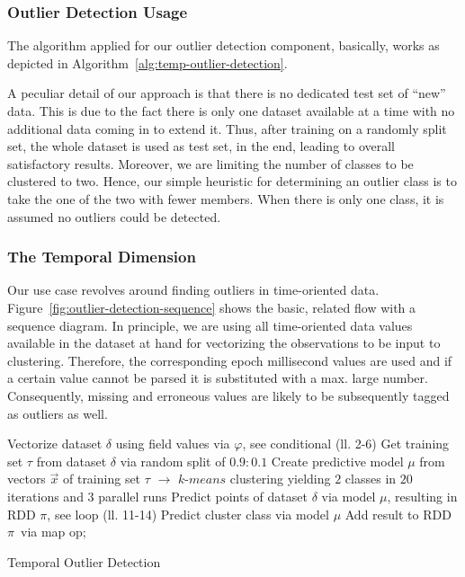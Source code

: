 \subsubsection{Outlier Detection Usage}

The algorithm applied for our outlier detection component, basically, works as depicted in Algorithm~\ref{alg:temp-outlier-detection}.

A peculiar detail of our approach is that there is no dedicated test set of ``new'' data.
This is due to the fact there is only one dataset available at a time with no additional data coming in to extend it.
Thus, after training on a randomly split set, the whole dataset is used as test set, in the end, leading to overall satisfactory results.
Moreover, we are limiting the number of classes to be clustered to two.
Hence, our simple heuristic for determining an outlier class is to take the one of the two with fewer members.
When there is only one class, it is assumed no outliers could be detected.

\subsubsection{The Temporal Dimension}

Our use case revolves around finding outliers in time-oriented data.
Figure~\ref{fig:outlier-detection-sequence} shows the basic, related flow with a sequence diagram.
In principle, we are using all time-oriented data values available in the dataset at hand for vectorizing the observations to be input to clustering.
Therefore, the corresponding epoch millisecond values are used and if a certain value cannot be parsed it is substituted with a max. large number.
Consequently, missing and erroneous values are likely to be subsequently tagged as outliers as well.

\newpage


\begin{algorithm}
  Vectorize dataset $\delta$ using field values via $\varphi$, see conditional (ll. 2-6)\;
  Get training set $\tau$ from dataset $\delta$ via random split of $0.9 : 0.1$\;
  Create predictive model $\mu$ from vectors $\vec{x}$ of training set $\tau$\;
  $\to$ $k$-$means$ clustering yielding $2$ classes in $20$ iterations and $3$ parallel runs\;
  Predict points of dataset $\delta$ via model $\mu$, resulting in RDD $\pi$, see loop (ll. 11-14)\;
  {
    Predict cluster class via model $\mu$\;
    Add result to RDD $\pi$\ via map op;
  }
  \caption{Temporal Outlier Detection}
  \label{alg:temp-outlier-detection}
\end{algorithm}

